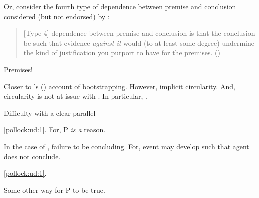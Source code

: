 \begin{note}
{    Or, consider the fourth type of dependence between premise and conclusion considered (but not endorsed) by \textcite{Pryor:2004ws}:

  \begin{quote}
    [Type 4] dependence between premise and conclusion is that the conclusion be such that evidence \emph{against it} would (to at least some degree) undermine the kind of justification you purport to have for the premises.%
    \mbox{}\hfill\mbox{(\citeyear[359]{Pryor:2004ws})}
  \end{quote}
  Premises!

  \nocite{Weisberg:2012vs}
  Closer to \citeauthor{Weisberg:2010to}'s (\citeyear{Weisberg:2010to}) account of bootstrapping.
  However, implicit circularity.
  And, circularity is not at issue with \qzS{}.
  In particular, \curb{}.
  }
\end{note}

\begin{note}
  Difficulty with a clear parallel


  \ref{pollock:ud:1}.
  For, P \emph{is a} reason.

  In the case of , failure to be concluding.
  For, event may develop such that agent does not conclude.

  \ref{pollock:ud:1}.

  Some other way for P to be true.
\end{note}

